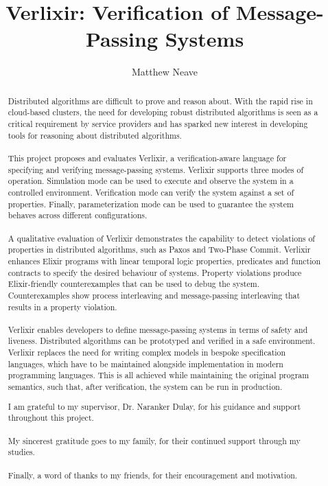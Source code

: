 \documentclass[a4paper, twoside]{report}
\title{Verlixir: Verification of Message-Passing Systems}
\author{Matthew Neave}
\begin{document}


\begin{abstract}
    Distributed algorithms are difficult to prove and reason about. With the rapid rise in cloud-based clusters, the need for developing robust distributed algorithms is seen as a critical requirement by service providers and has sparked new interest in developing tools for reasoning about distributed algorithms.
    \\ \\
    This project proposes and evaluates Verlixir, a verification-aware language for specifying and verifying message-passing systems. Verlixir supports three modes of operation. Simulation mode can be used to execute and observe the system in a controlled environment. Verification mode can verify the system against a set of properties. Finally, parameterization mode can be used to guarantee the system behaves across different configurations.
    \\ \\
    A qualitative evaluation of Verlixir demonstrates the capability to detect violations of properties in distributed algorithms, such as Paxos and Two-Phase Commit. Verlixir enhances Elixir programs with linear temporal logic properties, predicates and function contracts to specify the desired behaviour of systems. Property violations produce Elixir-friendly counterexamples that can be used to debug the system. Counterexamples show process interleaving and message-passing interleaving that results in a property violation.
    \\ \\
    Verlixir enables developers to define message-passing systems in terms of safety and liveness. Distributed algorithms can be prototyped and verified in a safe environment. Verlixir replaces the need for writing complex models in bespoke specification languages, which have to be maintained alongside implementation in modern programming languages. This is all achieved while maintaining the original program semantics, such that, after verification, the system can be run in production.
\end{abstract}
\renewcommand{\abstractname}{Acknowledgements}
\begin{abstract}
I am grateful to my supervisor, Dr. Naranker Dulay, for his guidance and support throughout this project. 
\\ \\
My sincerest gratitude goes to my family, for their continued support through my studies.
\\ \\
Finally, a word of thanks to my friends, for their encouragement and motivation.
\end{abstract}
\end{document}
